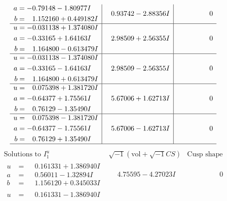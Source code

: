\documentclass[1p]{elsarticle_modified}
\theoremstyle{definition}
\newcommand{\I}{\sqrt{-1}}
\begin{document}
$$\begin{array}{c|c|c}
\begin{aligned}
a &= -0.79148 - 1.80977 I \\
b &= \phantom{-}1.152160 + 0.449182 I\end{aligned}
 & \phantom{-}0.93742 - 2.88356 I & \phantom{-0.000000 } 0 \\ \hline\begin{aligned}
u &= -0.031138 + 1.374080 I \\
a &= -0.33165 + 1.64163 I \\
b &= \phantom{-}1.164800 - 0.613479 I\end{aligned}
 & \phantom{-}2.98509 + 2.56355 I & \phantom{-0.000000 } 0 \\ \hline\begin{aligned}
u &= -0.031138 - 1.374080 I \\
a &= -0.33165 - 1.64163 I \\
b &= \phantom{-}1.164800 + 0.613479 I\end{aligned}
 & \phantom{-}2.98509 - 2.56355 I & \phantom{-0.000000 } 0 \\ \hline\begin{aligned}
u &= \phantom{-}0.075398 + 1.381720 I \\
a &= -0.64377 + 1.75561 I \\
b &= \phantom{-}0.76129 - 1.35490 I\end{aligned}
 & \phantom{-}5.67006 + 1.62713 I & \phantom{-0.000000 } 0 \\ \hline\begin{aligned}
u &= \phantom{-}0.075398 - 1.381720 I \\
a &= -0.64377 - 1.75561 I \\
b &= \phantom{-}0.76129 + 1.35490 I\end{aligned}
 & \phantom{-}5.67006 - 1.62713 I & \phantom{-0.000000 } 0\\
 \hline 
 \end{array}$$\newpage$$\begin{array}{c|c|c}  
\text{Solutions to }I^u_{1}& \I (\text{vol} + \sqrt{-1}CS) & \text{Cusp shape}\\
 \hline 
\begin{aligned}
u &= \phantom{-}0.161331 + 1.386940 I \\
a &= \phantom{-}0.56011 - 1.32894 I \\
b &= \phantom{-}1.156120 + 0.345033 I\end{aligned}
 & \phantom{-}4.75595 - 4.27023 I & \phantom{-0.000000 } 0 \\ \hline\begin{aligned}
u &= \phantom{-}0.161331 - 1.386940 I \\

\end{aligned}
\end{array}$$
\end{document}
